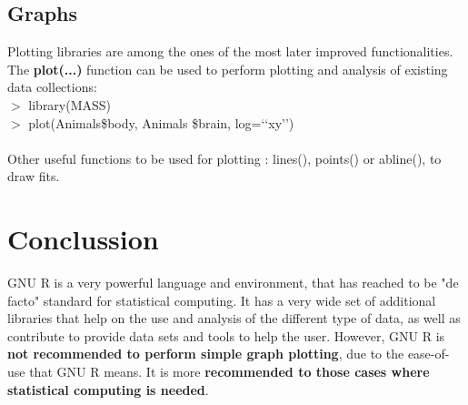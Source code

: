 \documentclass[11pt]{article}
\begin{document}
\subsection{Graphs}
Plotting libraries are among the ones of the most later improved functionalities. The \textbf{plot(...)} function can be used to perform plotting and analysis of existing data collections:\\
$>$ library(MASS)\\
$>$ plot(Animals\$body, Animals \$brain, log=‘‘xy’’)\\
\\
Other useful functions to be used for plotting : lines(), points() or abline(), to draw fits.

\section{Conclussion}
GNU R is a very powerful language and environment, that has reached to be "de facto" standard for statistical computing. It has a very wide set of additional libraries that help on the use and analysis of the different type of data, as well as contribute to provide data sets and tools to help the user. However, GNU R is \textbf{not recommended to perform simple graph plotting}, due to the ease-of-use that GNU R means. It is more \textbf{recommended to those cases where statistical computing is needed}.
\end{document}
